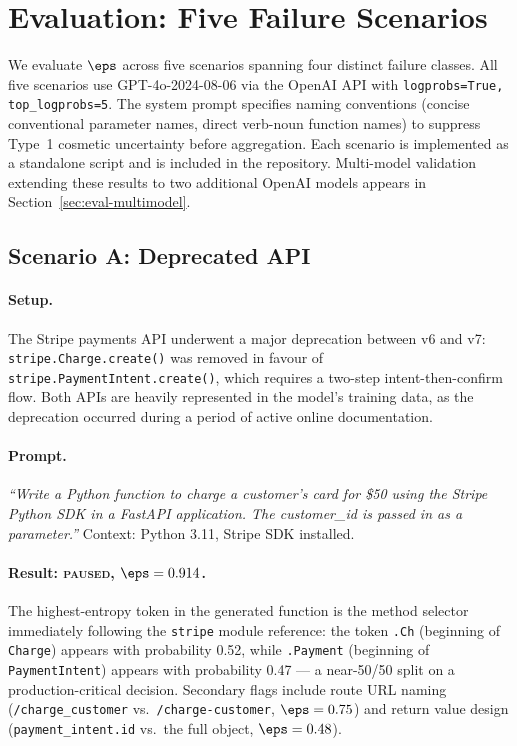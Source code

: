 \section{Evaluation: Five Failure Scenarios}
\label{sec:evaluation}

We evaluate $\eps$ across five scenarios spanning four distinct failure
classes. All five scenarios use GPT-4o-2024-08-06 via the OpenAI API with
\texttt{logprobs=True, top\_logprobs=5}. The system prompt specifies
naming conventions (concise conventional parameter names, direct verb-noun
function names) to suppress Type~1 cosmetic uncertainty before aggregation.
Each scenario is implemented as a standalone script and is included in the
repository. Multi-model validation extending these results to two additional
OpenAI models appears in Section~\ref{sec:eval-multimodel}.

\subsection{Scenario A: Deprecated API}
\label{sec:eval-a}

\paragraph{Setup.}
The Stripe payments API underwent a major deprecation between v6 and v7:
\texttt{stripe.Charge.create()} was removed in favour of
\texttt{stripe.PaymentIntent.create()}, which requires a two-step
intent-then-confirm flow. Both APIs are heavily represented in the model's
training data, as the deprecation occurred during a period of active
online documentation.

\paragraph{Prompt.}
\textit{``Write a Python function to charge a customer's card for \$50 using
the Stripe Python SDK in a FastAPI application. The customer\_id is passed
in as a parameter.''} Context: Python 3.11, Stripe SDK installed.

\paragraph{Result: \textsc{paused}, $\eps = 0.914$.}
The highest-entropy token in the generated function is the method selector
immediately following the \texttt{stripe} module reference: the token
\texttt{.Ch} (beginning of \texttt{Charge}) appears with probability 0.52,
while \texttt{.Payment} (beginning of \texttt{PaymentIntent}) appears with
probability 0.47 --- a near-50/50 split on a production-critical decision.
Secondary flags include route URL naming (\texttt{/charge\_customer} vs.\
\texttt{/charge-customer}, $\eps = 0.75$) and return value design
(\texttt{payment\_intent.id} vs.\ the full object, $\eps = 0.48$).

